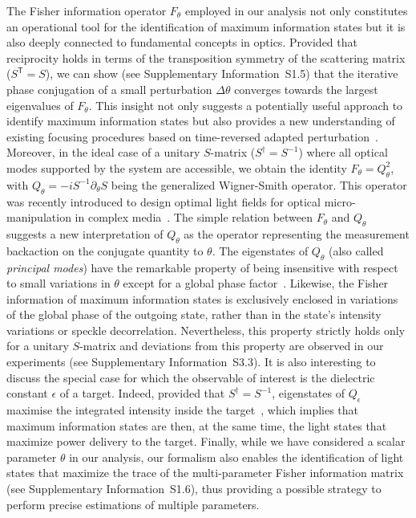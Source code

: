 \documentclass[aps,pra,twocolumn,amsmath,amssymb,superscriptaddress,10pt,nobibnotes]{revtex4-2}
\begin{document}
The Fisher information operator $F_\theta$ employed in our analysis not only constitutes an operational tool for the identification of maximum information states but it is also deeply connected to fundamental concepts in optics. Provided that reciprocity holds in terms of the transposition symmetry of the scattering matrix ($S^\mathsf{T}=S$), we can show (see Supplementary Information~S1.5) that the iterative phase conjugation of a small perturbation $\Delta \theta$ converges towards the largest eigenvalues of $F_\theta$. This insight not only suggests a potentially useful approach to identify maximum information states but also provides a new understanding of existing focusing procedures based on time-reversed adapted perturbation~\cite{zhou_focusing_2014,ma_time-reversed_2014,ruan_focusing_2017}. Moreover, in the ideal case of a unitary $S$-matrix ($S^\dagger=S
^{-1}$) where all optical modes supported by the system are accessible, we obtain the identity $F_\theta = Q_\theta^2$, with $Q_\theta=-i S^{-1} \partial_\theta S$ being the generalized Wigner-Smith operator. This operator was recently introduced to design optimal light fields for optical micro-manipulation in complex media~\cite{ambichl_focusing_2017,horodynski_optimal_2020}. The simple relation between $F_\theta$ and $Q_\theta$ suggests a new interpretation of $Q_\theta$ as the operator representing the measurement backaction on the conjugate quantity to $\theta$. The eigenstates of $Q_\theta$ (also called {\it principal modes}) have the remarkable property of being insensitive with respect to small variations in $\theta$ except for a global phase factor~\cite{carpenter_observation_2015,xiong_spatiotemporal_2016}. Likewise, the Fisher information of maximum information states is exclusively enclosed in variations of the global phase of the outgoing state, rather than in the state's intensity variations or speckle decorrelation. Nevertheless, this property strictly holds only for a unitary $S$-matrix and deviations from this property are observed in our experiments (see Supplementary Information~S3.3). It is also interesting to discuss the special case for which the observable of interest is the dielectric constant $\epsilon$ of a target. Indeed, provided that $S^\dagger=S^{-1}$, eigenstates of $Q_\epsilon$ maximise the integrated intensity inside the target~\cite{horodynski_optimal_2020}, which implies that maximum information states are then, at the same time, the light states that maximize power delivery to the target. Finally, while we have considered a scalar parameter $\theta$ in our analysis, our formalism also enables the identification of light states that maximize the trace of the multi-parameter Fisher information matrix (see Supplementary Information~S1.6), thus providing a possible strategy to perform precise estimations of multiple parameters.
\end{document}
